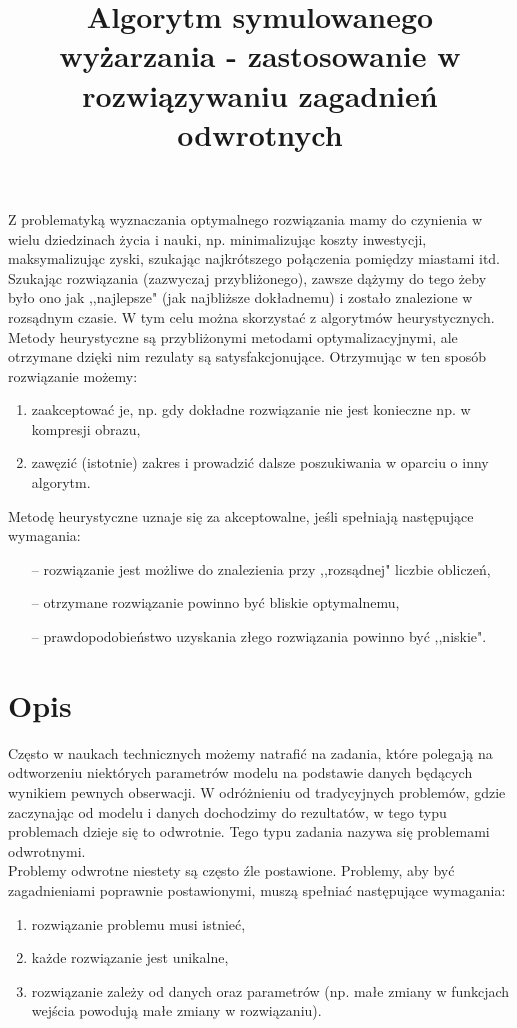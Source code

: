 \documentclass[twoside]{projektInzynierskiMS1}
\title{Algorytm symulowanego wyżarzania - zastosowanie w rozwiązywaniu zagadnień odwrotnych}
\newcommand{\si}{ś}
\begin{document}
Z problematyką wyznaczania optymalnego rozwiązania mamy do czynienia w wielu dziedzinach życia i nauki, np. minimalizując koszty inwestycji, maksymalizując zyski, szukając najkrótszego połączenia pomiędzy miastami itd. Szukając rozwiązania (zazwyczaj przybliżonego), zawsze dążymy do tego żeby było ono jak ,,najlepsze" (jak najbliższe dokładnemu) i zostało znalezione w rozsądnym czasie. W tym celu można skorzystać z algorytmów heurystycznych. \\ 


Metody heurystyczne są przybliżonymi metodami optymalizacyjnymi, ale otrzymane dzięki nim rezulaty są satysfakcjonujące. Otrzymując w ten sposób rozwiązanie możemy:

\begin{enumerate}
	\item zaakceptować je, np. gdy dokładne rozwiązanie nie jest konieczne np. w kompresji obrazu,
	\item zawęzić (istotnie) zakres i prowadzić dalsze poszukiwania w oparciu o inny algorytm. \\
\end{enumerate}
Metodę heurystyczne uznaje się za akceptowalne, jeśli spełniają następujące wymagania:
\begin{itemize}
	\item[--] rozwiązanie jest możliwe do znalezienia przy ,,rozsądnej" liczbie obliczeń,
	\item[--] otrzymane rozwiązanie powinno być bliskie optymalnemu,
	\item[--] prawdopodobieństwo uzyskania złego rozwiązania powinno być ,,niskie".
\end{itemize}

\section{Opis}
Często w naukach technicznych możemy natrafić na zadania, które polegają na odtworzeniu niektórych parametrów modelu na podstawie danych będących wynikiem pewnych obserwacji. W odróżnieniu od tradycyjnych problemów, gdzie zaczynając od modelu i danych dochodzimy do rezultatów, w tego typu problemach dzieje się to odwrotnie. Tego typu zadania nazywa się problemami odwrotnymi. \\

Problemy odwrotne niestety są często źle postawione. Problemy, aby być zagadnieniami poprawnie postawionymi, muszą spełniać następujące wymagania:
\begin{enumerate}
	\item rozwiązanie problemu musi istnieć,
	\item każde rozwiązanie jest unikalne,
	\item rozwiązanie zależy od danych oraz parametrów (np. małe zmiany w funkcjach wej\si cia powodują małe zmiany w rozwiązaniu). \\
\end{enumerate}
\end{document}
